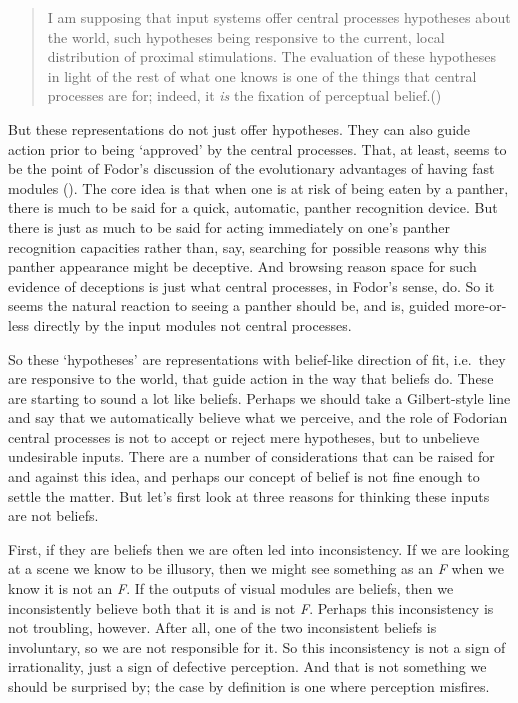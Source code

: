 \documentclass[
  11pt,
  letterpaper,
  DIV=11,
  numbers=noendperiod,
  oneside]{scrartcl}
\begin{document}
\begin{quote}
I am supposing that input systems offer central processes hypotheses
about the world, such hypotheses being responsive to the current, local
distribution of proximal stimulations. The evaluation of these
hypotheses in light of the rest of what one knows is one of the things
that central processes are for; indeed, it \emph{is} the fixation of
perceptual belief.()
\end{quote}

But these representations do not just offer hypotheses. They can also
guide action prior to being `approved' by the central processes. That,
at least, seems to be the point of Fodor's discussion of the
evolutionary advantages of having fast modules
(). The core idea is that
when one is at risk of being eaten by a panther, there is much to be
said for a quick, automatic, panther recognition device. But there is
just as much to be said for acting immediately on one's panther
recognition capacities rather than, say, searching for possible reasons
why this panther appearance might be deceptive. And browsing reason
space for such evidence of deceptions is just what central processes, in
Fodor's sense, do. So it seems the natural reaction to seeing a panther
should be, and is, guided more-or-less directly by the input modules not
central processes.

So these `hypotheses' are representations with belief-like direction of
fit, i.e.~they are responsive to the world, that guide action in the way
that beliefs do. These are starting to sound a lot like beliefs. Perhaps
we should take a Gilbert-style line and say that we automatically
believe what we perceive, and the role of Fodorian central processes is
not to accept or reject mere hypotheses, but to unbelieve undesirable
inputs.
There are a number of considerations that can be raised for and against
this idea, and perhaps our concept of belief is not fine enough to
settle the matter. But let's first look at three reasons for thinking
these inputs are not beliefs.

First, if they are beliefs then we are often led into inconsistency. If
we are looking at a scene we know to be illusory, then we might see
something as an \emph{F} when we know it is not an \emph{F}. If the
outputs of visual modules are beliefs, then we inconsistently believe
both that it is and is not \emph{F}. Perhaps this inconsistency is not
troubling, however. After all, one of the two inconsistent beliefs is
involuntary, so we are not responsible for it. So this inconsistency is
not a sign of irrationality, just a sign of defective perception. And
that is not something we should be surprised by; the case by definition
is one where perception misfires.
\end{document}

